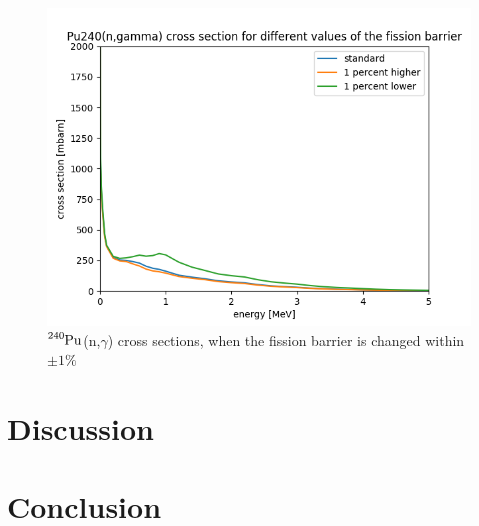 \documentclass[]{article}
\begin{document}
  \begin{figure} [H]
	\centering
	\includegraphics[scale=0.7]{Gamma_cross_section_varying_fission_barrier.png}
	\caption{ $\ce{^{240}Pu}$(n,$\gamma$) cross sections, when the fission barrier is changed within $\pm 1 \%$ }
	\label{fig:Gamma_cross_section_varying_fission_barrier}
\end{figure}

\section{Discussion}

\section{Conclusion}



 
\end{document}
